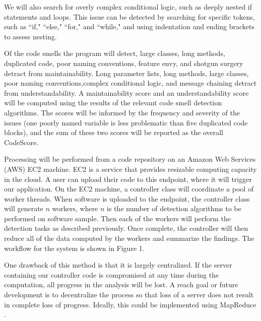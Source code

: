 \documentclass{sig-alternate}
\begin{document}
We will also search for overly complex conditional logic, such as deeply nested if statements and loops. This issue can be detected by searching for specific tokens, such as ``if," ``else," ``for," and ``while," and using indentation and ending brackets to assess nesting.

Of the code smells the program will detect, large classes, long methods, duplicated code, poor naming conventions, feature envy, and shotgun surgery detract from maintainability. Long parameter lists, long methods, large classes, poor naming conventions,complex conditional logic, and message chaining detract from understandability. A maintainability score and an understandability score will be computed using the results of the relevant code smell detection algorithms. The scores will be informed by the frequency and severity of the issues (one poorly named variable is less problematic than five duplicated code blocks), and the sum of these two scores will be reported as the overall CodeScore.

Processing will be performed from a code repository on an Amazon Web Services (AWS) EC2 machine. EC2 is a service that provides resizable computing capacity in the cloud. A user can upload their code to this endpoint, where it will trigger our application. On the EC2 machine, a controller class will coordinate a pool of worker threads. When software is uploaded to the endpoint, the controller class will generate $n$ workers, where $n$ is the number of detection algorithms to be performed on software sample. Then each of the workers will perform the detection tasks as described previously. Once complete, the controller will then reduce all of the data computed by the workers and summarize the findings. The workflow for the system is shown in Figure 1. 

One drawback of this method is that it is largely centralized. If the server containing our controller code is compromised at any time during the computation, all progress in the analysis will be lost. A reach goal or future development is to decentralize the process so that loss of a server does not result in complete loss of progress. Ideally, this could be implemented using MapReduce \cite{dean2008mapreduce}.
\end{document}
